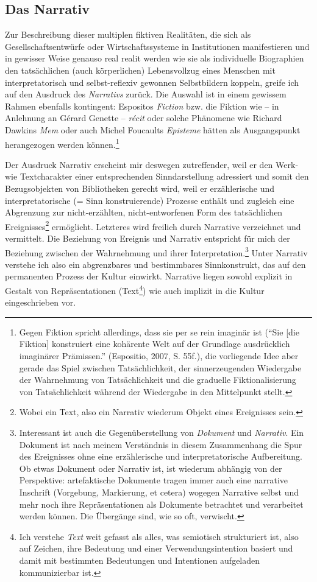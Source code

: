 \documentclass[output=paper]{langscibook}
\begin{document}
\hypertarget{das-narrativ}{%
\subsection*{Das Narrativ}\label{das-narrativ}}

Zur Beschreibung dieser multiplen fiktiven Realitäten, die sich als
Gesellschaftsentwürfe oder Wirtschaftssysteme in Institutionen
manifestieren und in gewisser Weise genauso real realit werden wie sie
als individuelle Biographien den tatsächlichen (auch körperlichen)
Lebensvollzug eines Menschen mit interpretatorisch und selbst-reflexiv
gewonnen Selbstbildern koppeln, greife ich auf den Ausdruck des
\emph{Narrativs} zurück. Die Auswahl ist in einem gewissem Rahmen
ebenfalls kontingent: Espositos \emph{Fiction} bzw. die Fiktion wie --
in Anlehnung an Gérard Genette -- \emph{récit} oder solche Phänomene wie
Richard Dawkins \emph{Mem} oder auch Michel Foucaults \emph{Episteme}
hätten als Ausgangspunkt herangezogen werden können.\footnote{Gegen
  Fiktion spricht allerdings, dass sie per se rein imaginär ist
  (\enquote{Sie {[}die Fiktion{]} konstruiert eine kohärente Welt auf
  der Grundlage ausdrücklich imaginärer Prämissen.} (Espositio, 2007, S.
  55f.), die vorliegende Idee aber gerade das Spiel zwischen
  Tatsächlichkeit, der sinnerzeugenden Wiedergabe der Wahrnehmung von
  Tatsächlichkeit und die graduelle Fiktionalisierung von
  Tatsächlichkeit während der Wiedergabe in den Mittelpunkt stellt.}

Der Ausdruck Narrativ erscheint mir deswegen zutreffender, weil er den
Werk- wie Textcharakter einer entsprechenden Sinndarstellung adressiert
und somit den Bezugsobjekten von Bibliotheken gerecht wird, weil er
erzählerische und interpretatorische (= Sinn konstruierende) Prozesse
enthält und zugleich eine Abgrenzung zur nicht-erzählten,
nicht-entworfenen Form des tatsächlichen Ereignisses\footnote{Wobei ein
  Text, also ein Narrativ wiederum Objekt eines Ereignisses sein.}
ermöglicht. Letzteres wird freilich durch Narrative verzeichnet und
vermittelt. Die Beziehung von Ereignis und Narrativ entspricht für mich
der Beziehung zwischen der Wahrnehmung und ihrer
Interpretation.\footnote{Interessant ist auch die Gegenüberstellung von
  \emph{Dokument} und \emph{Narrativ}. Ein Dokument ist nach meinem
  Verständnis in diesem Zusammenhang die Spur des Ereignisses ohne eine
  erzählerische und interpretatorische Aufbereitung. Ob etwas Dokument
  oder Narrativ ist, ist wiederum abhängig von der Perspektive:
  artefaktische Dokumente tragen immer auch eine narrative Inschrift
  (Vorgebung, Markierung, et cetera) wogegen Narrative selbst und mehr
  noch ihre Repräsentationen als Dokumente betrachtet und verarbeitet
  werden können. Die Übergänge sind, wie so oft, verwischt.} Unter
Narrativ verstehe ich also ein abgrenzbares und bestimmbares
Sinnkonstrukt, das auf den permanenten Prozess der Kultur einwirkt.
Narrative liegen sowohl explizit in Gestalt von Repräsentationen
(Text\footnote{Ich verstehe \emph{Text} weit gefasst als alles, was
  semiotisch strukturiert ist, also auf Zeichen, ihre Bedeutung und
  einer Verwendungsintention basiert und damit mit bestimmten
  Bedeutungen und Intentionen aufgeladen kommunizierbar ist.}) wie auch
implizit in die Kultur eingeschrieben vor.
\end{document}
